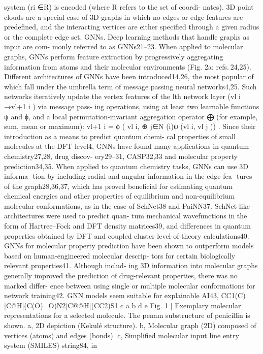 system (ri ∈R) is encoded (where R refers to the set of coordi-
nates). 3D point clouds are a special case of 3D graphs in which no
edges or edge features are predefined, and the interacting vertices
are either specified through a given radius or the complete edge set.
GNNs. Deep learning methods that handle graphs as input are com-
monly referred to as GNNs21–23. When applied to molecular graphs,
GNNs perform feature extraction by progressively aggregating
information from atoms and their molecular environments (Fig. 2a;
refs. 24,25). Different architectures of GNNs have been introduced14,26,
the most popular of which fall under the umbrella term of message
passing neural networks4,25. Such networks iteratively update the
vertex features of the lth network layer (vl
i →vl+1
i
) via message pass-
ing operations, using at least two learnable functions ψ and ϕ, and a
local permutation-invariant aggregation operator ⨁ (for example,
sum, mean or maximum): vl+1
i
= ϕ
(
vl
i, ⊕
j∈N (i)ψ (vl
i, vl
j
))
.
Since their introduction as a means to predict quantum chemi-
cal properties of small molecules at the DFT level4, GNNs have
found many applications in quantum chemistry27,28, drug discov-
ery29–31, CASP32,33 and molecular property prediction34,35. When
applied to quantum chemistry tasks, GNNs can use 3D informa-
tion by including radial and angular information in the edge fea-
tures of the graph28,36,37, which has proved beneficial for estimating
quantum chemical energies and other properties of equilibrium and
non-equilibrium molecular conformations, as in the case of SchNet38
and PaiNN37. SchNet-like architectures were used to predict quan-
tum mechanical wavefunctions in the form of Hartree–Fock and
DFT density matrices39, and differences in quantum properties
obtained by DFT and coupled cluster level-of-theory calculations40.
GNNs for molecular property prediction have been shown to
outperform models based on human-engineered molecular descrip-
tors for certain biologically relevant properties41. Although includ-
ing 3D information into molecular graphs generally improved the
prediction of drug-relevant properties, there was no marked differ-
ence between using single or multiple molecular conformations for
network training42. GNN models seem suitable for explainable AI43,
CC1(C)[C@H](C(O)=O)N2[C@@H](CC2)S1
c
a
b
d
e
Fig. 1 | Exemplary molecular representations for a selected molecule.
The penam substructure of penicillin is shown. a, 2D depiction (Kekulé
structure). b, Molecular graph (2D) composed of vertices (atoms) and edges
(bonds). c, Simplified molecular input line entry system (SMILES) string84, in
